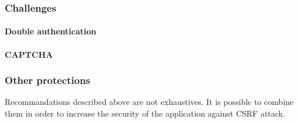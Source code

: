 \documentclass[a4paper,11pt]{report}
\begin{document}
  \subsubsection{Challenges}
  
  \paragraph{Double authentication} %
  \paragraph{CAPTCHA} %
  
  \subsubsection{Other protections}
  
  Recommandations described above are not exhaustives. It is possible to combine them in order to increase 
  the security of the application against CSRF attack.
  
\end{document}
